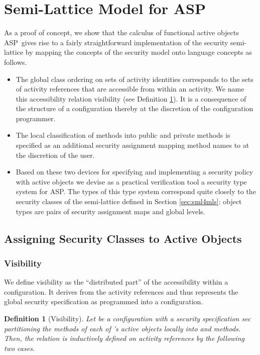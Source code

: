 \documentclass[10pt, conference, compsocconf]{IEEEtran}
\newcommand\aspfun{ASP\ }
\newcommand\aspfunp{ASP}
\newtheorem{definition}{Definition}[section]
\begin{document}
{\section{Semi-Lattice Model for \aspfun}
\label{sec:smlasp}
As a proof of concept, we show that the calculus of functional active objects
\aspfun gives rise to a fairly straightforward implementation of the security semi-lattice
by mapping the concepts of the security model onto language concepts as follows.
\begin{itemize}
\item The global class ordering on sets of activity identities corresponds to the
      sets of activity references that are accessible from within an activity. We name this
      accessibility relation visibility (see Definition \ref{def:vis}). It is a consequence
      of the structure of a configuration thereby at the discretion of the configuration programmer.
\item The local classification of methods into public  and private  methods is specified
      as an additional security assignment mapping method names to  at the discretion of the
      user.
\item Based on these two devices for specifying and implementing a security policy with active objects
      we devise as a practical verification tool a security type system for \aspfunp. The types of this
      type system correspond quite closely to the security classes of the semi-lattice defined in Section
      \ref{sec:sml4mls}: object types are pairs of security assignment maps and global levels.
\end{itemize}


\subsection{Assigning Security Classes to Active Objects}

\subsubsection*{Visibility}
We define visibility as the ``distributed part'' of the accessibility 
within a configuration. It derives from the activity references and
thus represents the global security specification as programmed into 
a configuration.

\begin{definition}[Visibility]
\label{def:vis}
Let  be a configuration with a security specification
{\it sec} partitioning the methods of each of 's active objects locally into  and 
methods.
Then, the relation  is inductively defined on activity references by the following two cases.


\end{definition}}
\end{document}
